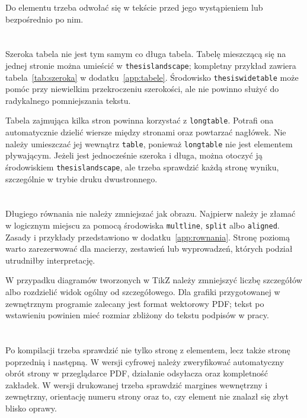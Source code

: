 Do elementu trzeba odwołać się w tekście przed jego wystąpieniem lub bezpośrednio po nim.

\section{}

Szeroka tabela nie jest tym samym co długa tabela. Tabelę mieszczącą się na jednej stronie można umieścić w \texttt{thesislandscape}; kompletny przykład zawiera tabela~\ref{tab:szeroka} w dodatku~\ref{app:tabele}. Środowisko \texttt{thesiswidetable} może pomóc przy niewielkim przekroczeniu szerokości, ale nie powinno służyć do radykalnego pomniejszania tekstu.

Tabela zajmująca kilka stron powinna korzystać z \texttt{longtable}. Potrafi ona automatycznie dzielić wiersze między stronami oraz powtarzać nagłówek. Nie należy umieszczać jej wewnątrz \texttt{table}, ponieważ \texttt{longtable} nie jest elementem pływającym. Jeżeli jest jednocześnie szeroka i długa, można otoczyć ją środowiskiem \texttt{thesislandscape}, ale trzeba sprawdzić każdą stronę wyniku, szczególnie w trybie druku dwustronnego.

\section{}

Długiego równania nie należy zmniejszać jak obrazu. Najpierw należy je złamać w logicznym miejscu za pomocą środowiska \texttt{multline}, \texttt{split} albo \texttt{aligned}. Zasady i przykłady przedstawiono w dodatku~\ref{app:rownania}. Stronę poziomą warto zarezerwować dla macierzy, zestawień lub wyprowadzeń, których podział utrudniłby interpretację.

W przypadku diagramów tworzonych w TikZ należy zmniejszyć liczbę szczegółów albo rozdzielić widok ogólny od szczegółowego. Dla grafiki przygotowanej w zewnętrznym programie zalecany jest format wektorowy PDF; tekst po wstawieniu powinien mieć rozmiar zbliżony do tekstu podpisów w pracy.

\section{}

Po kompilacji trzeba sprawdzić nie tylko stronę z elementem, lecz także stronę poprzednią i następną. W wersji cyfrowej należy zweryfikować automatyczny obrót strony w przeglądarce PDF, działanie odsyłacza oraz kompletność zakładek. W wersji drukowanej trzeba sprawdzić margines wewnętrzny i zewnętrzny, orientację numeru strony oraz to, czy element nie znalazł się zbyt blisko oprawy.

